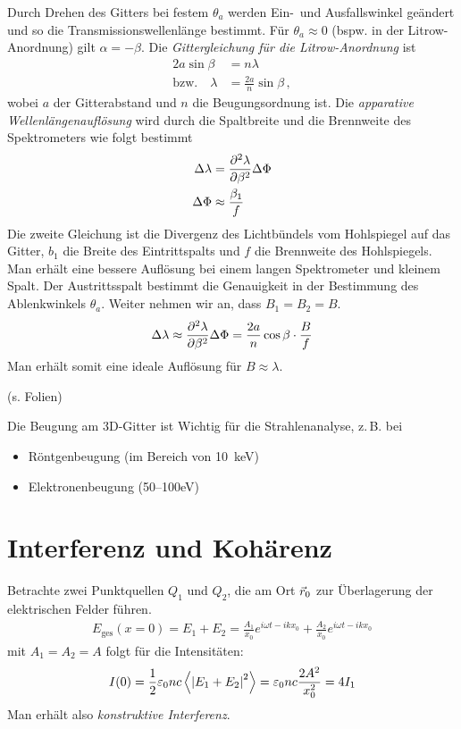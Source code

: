 Durch Drehen des Gitters bei festem $\theta_a$
werden Ein-~und Ausfallswinkel geändert und so die
Transmissionswellenlänge bestimmt.
Für $\theta_a\approx 0$ (bspw. in der
Litrow-Anordnung) gilt $\alpha=-\beta$.
Die \emph{Gittergleichung für die Litrow-Anordnung}%
 ist
\begin{align*}
  2a\sin\beta &=n\lambda\\
  \text{bzw.}\quad \lambda &= \frac{2a}{n}\sin\beta\,,
\end{align*}
wobei $a$ der Gitterabstand und $n$ die Beugungsordnung ist. 
Die \emph{apparative Wellenlängenauflösung} wird durch die Spaltbreite
und die Brennweite des Spektrometers wie folgt bestimmt
\begin{align*}
  \Delta\lambda &=\diff[\lambda]{\beta}\Delta\Phi\\
  \Delta\Phi &\approx \frac{\beta_1}{f}
\end{align*}
Die zweite Gleichung ist die Divergenz des Lichtbündels vom
Hohlspiegel auf das Gitter, $b_1$ die Breite des Eintrittspalts und
$f$ die Brennweite des Hohlspiegels. Man erhält eine bessere Auflösung
bei einem langen Spektrometer und kleinem Spalt. Der Austrittsspalt
bestimmt die Genauigkeit in der Bestimmung des Ablenkwinkels
$\theta_a$. Weiter nehmen wir an, dass $B_1=B_2=B$.
\begin{align*}
  \Delta\lambda 
  \approx \diff[\lambda]{\beta}\Delta\Phi
  = \frac{2a}{n}\cos\beta \cdot \frac{B}{f}
\end{align*}
Man erhält somit eine ideale Auflösung für $B\approx\lambda$.

(s. Folien)

Die Beugung am 3D-Gitter ist Wichtig für die Strahlenanalyse, z.\,B. bei
\begin{itemize}
\item Röntgenbeugung (im Bereich von \SI{10}{\kilo\eV})
\item Elektronenbeugung (50–100\si{\eV})
\end{itemize}


\section{Interferenz und Kohärenz}
Betrachte zwei Punktquellen $Q_1$ und $Q_2$, die am Ort $\vecr_0$ zur
Überlagerung der elektrischen Felder führen. 
\begin{align*}
  E_\text{ges}(x=0) 
  = E_1+E_2
  =\frac{A_1}{x_0}e^{i\omega t-ikx_0} + \frac{A_2}{x_0}e^{i\omega t- ikx_0}
\end{align*}
mit $A_1=A_2=A$ folgt für die Intensitäten:
\begin{align*}
  I(0)
  = \fracone{2}\epso nc\left\langle\left|E_1 + E_2\right|^2\right\rangle 
  = \epso nc\frac{2A^2}{x_0^2}
  = 4I_1
\end{align*}
Man erhält also \emph{konstruktive Interferenz}.

